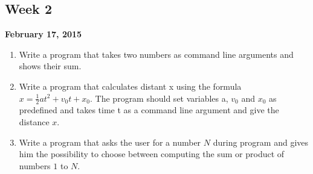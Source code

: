 \documentclass[12pt,letterpaper,twoside]{article}
\begin{document}




\subsection*{Week 2}
\hfill \textbf{February 17, 2015}

\begin{enumerate}\itemsep=0pt
\item Write a program that takes two numbers as command line arguments and shows their sum.
\item Write a program that calculates distant x using the formula $x = \frac{1}{2}at^2 + v_0t+x_0$. The program should set variables a, $v_0$ and $x_0$ as predefined and takes time t as a command line argument and give the distance $x$.
\item Write a program that asks the user for a number $N$ during program and gives him the possibility to choose between computing the sum or product of numbers $1$ to $N$.
\end{enumerate}
\end{document}
